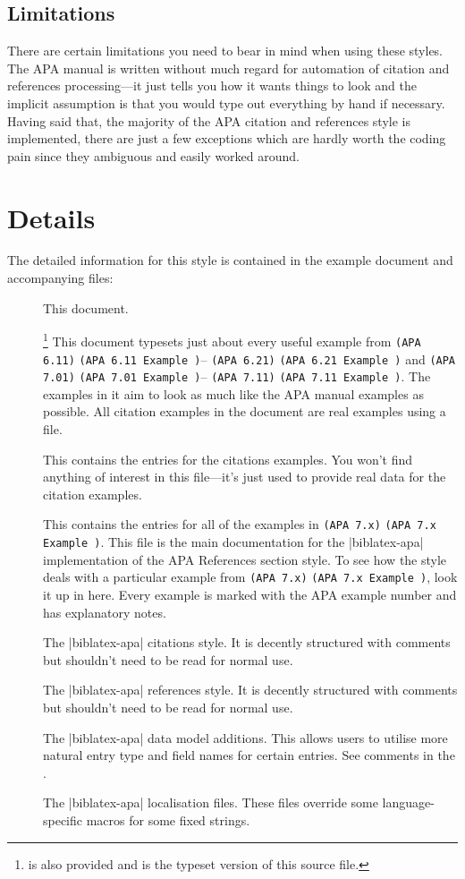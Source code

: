 \documentclass{ltxdockit}
\newcommand\apa[2][]{\ifthenelse{\equal{#1}{}}%
                       {\texttt{(APA #2)}}%
                       {\texttt{(APA #2 Example #1)}}}
\begin{document}
\subsection{Limitations}
\label{use:limit}
There are certain limitations you need to bear in mind when using these
styles. The APA manual is written without much regard for automation of
citation and references processing---it just tells you how it wants things to
look and the implicit assumption is that you would type out everything by
hand if necessary. Having said that, the majority of the APA citation
and references style is implemented, there are just a few exceptions which
are hardly worth the coding pain since they ambiguous and easily worked
around.

\section{Details}

The detailed information for this style is contained in the example document and
accompanying  files:
\begin{description}
\item[] This document.
\item[]\footnote{
    is also provided and is the typeset version of this \latex source
    file.} This document typesets just about every useful example from
  \apa{6.11}--\apa{6.21} and \apa{7.01}--\apa{7.11}. The examples in it
  aim to look as much like the APA manual examples as possible. All
  citation examples in the document are real examples using a 
  file.
\item[] This contains the 
  entries for the citations examples. You won't find anything of interest
  in this file---it's just used to provide real data for the citation
  examples.
\item[] This contains the
   entries for all of the examples in \apa{7.x}. This file is
  the main documentation for the |biblatex-apa| implementation of the APA
  References section style. To see how the style deals with a particular
  example from \apa{7.x}, look it up in here. Every example is marked with
  the APA example number and has explanatory notes.
\item[] The |biblatex-apa| citations style. It is
  decently structured with comments but shouldn't need to be read for
  normal use.
\item[] The |biblatex-apa| references style. It is
  decently structured with comments but shouldn't need to be read for
  normal use.
\item[] The |biblatex-apa| data model additions. This allows
  users to utilise more natural entry type and field names for certain
  entries. See comments in the .
\item[] The |biblatex-apa| localisation files. These files
  override some language-specific macros for some fixed strings.
\end{description}
\end{document}
